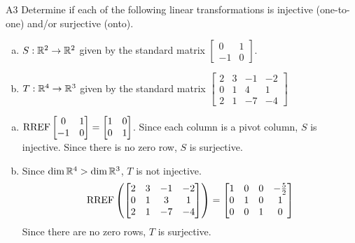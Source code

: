 \begin{problem}{A3}
Determine if each of the following linear transformations is injective (one-to-one) and/or surjective (onto).
\begin{enumerate}[(a)]
\item $S: \mathbb{R}^2 \rightarrow \mathbb{R}^2$ given by the standard matrix $\begin{bmatrix} 0 & 1 \\ -1 & 0 \end{bmatrix}$.
\item $T: \mathbb{R}^4 \rightarrow \mathbb{R}^3$ given by the standard matrix $\begin{bmatrix} 2 & 3 & -1 & -2 \\ 0 & 1 & 4 & 1 \\ 2 & 1 & -7 & -4 \end{bmatrix}$
\end{enumerate}
\end{problem}
\begin{solution}
\begin{enumerate}[(a)]
\item $ \operatorname{RREF}\begin{bmatrix} 0 & 1 \\ -1 & 0 \end{bmatrix}=\begin{bmatrix}1 & 0 \\ 0 & 1 \end{bmatrix}$.  Since each column is a pivot column, $S$ is injective.  Since there is no zero row, $S$ is surjective.
\item Since $\dim \mathbb{R}^4 > \dim \mathbb{R}^3$, $T$ is not injective.
$$\operatorname{RREF}\left(\begin{bmatrix} 2 & 3 & -1 & -2 \\ 0 & 1 & 3 & 1 \\ 2 & 1 & -7 & -4 \end{bmatrix}\right) = \begin{bmatrix} 1 & 0 & 0 & -\frac{5}{2} \\ 0 & 1 & 0 & 1 \\ 0 & 0 & 1 & 0\end{bmatrix}$$
Since there are no zero rows, $T$ is surjective.
\end{enumerate}
\end{solution}

